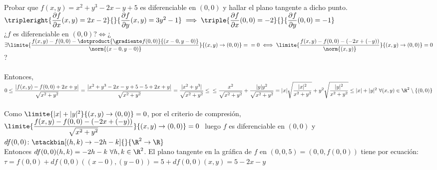 	\begin{ejem} Probar que $f(x,y)=x^2+y^3-2x-y+5$ es diferenciable en $(0,0)$ y hallar el plano tangente a dicho punto.\\
	$\tripleright{\dfrac{\partial f}{\partial x}(x,y)=2x-2}{}{\dfrac{\partial f}{\partial y}(x,y)=3y^2-1}\implies\triple{\dfrac{\partial f}{\partial x}(0,0)=-2}{}{\dfrac{\partial f}{\partial y}(0,0)=-1}$\\
	¿$f$ es diferenciable en $(0,0)$?$\iff$¿$\exists\limite{\dfrac{f(x,y)-f(0,0)-\dotproduct{\gradiente f(0,0)}{(x-0,y-0)}}{\norm{(x-0,y-0)}}}{(x,y)\to (0,0)}=\\=0\iff \limite{\dfrac{f(x,y)-f(0,0)-(-2x+(-y))}{\norm{(x,y)}}}{(x,y)\to (0,0)}=0$ ?\\\\
	Entonces, $0\leq \dfrac{|f(x,y)-f(0,0)+2x+y|}{\sqrt{x^2+y^2}}=\dfrac{|x^2+y^3-2x-y+5-5+2x+y|}{\sqrt{x^2+y^2}}=\dfrac{|x^2+y^3|}{\sqrt{x^2+y^2}}\leq\\\leq\dfrac{x^2}{\sqrt{x^2+y^2}}+\dfrac{|y|y^2}{\sqrt{x^2+y^2}}=|x|\sqrt{\dfrac{|x|^2}{x^2+y^2}}+y^2\sqrt{\dfrac{|y|^2}{x^2+y^2}}\leq|x|+|y|^2\ \forall(x,y)\in \R^2\setminus\{(0,0)\}$\\\\
	Como $\limite{|x|+|y|^2}{(x,y)\to (0,0)}=0$, por el criterio de compresión, $\\\limite{\dfrac{f(x,y)-f(0,0)-(-2x+(-y))}{\sqrt{x^2+y^2}}}{(x,y)\to (0,0)}=0\ $ luego $f$ es diferenciable en $(0,0)$ y \\
	$df(0,0)\colon \stackbin[(h,k)\to-2h- k]{}{\R^2\to\R}$\\
	Entonces $df(0,0)(h,k)=-2h-k\ \forall h,k\in\R^2$. El plano tangente en la gráfica de $f$ en $(0,0,5)=(0,0,f(0,0))$ tiene por ecuación:\\
	$\tau=f(0,0)+df(0,0)((x-0),(y-0))=5+df(0,0)(x,y)=5-2x-y$
	\begin{figura}\ \\
	\begin{center}
	\end{center}
	\end{figura}
	\end{ejem}
	
